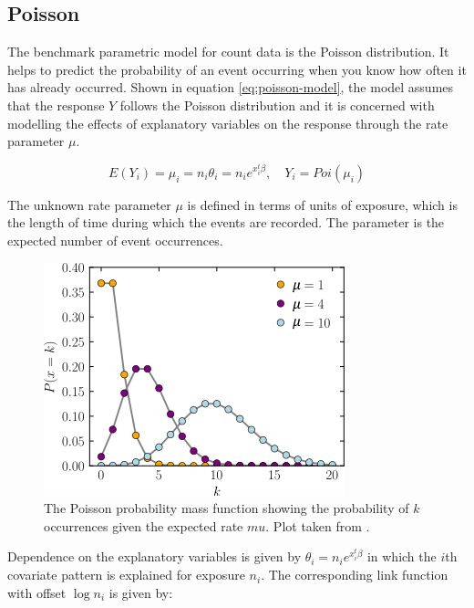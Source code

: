 \documentclass{thesis}
\begin{document}
\subsection{Poisson}

The benchmark parametric model for count data is the Poisson distribution\cite{cameron_trivedi_2013}. It helps to predict the probability of an event occurring when you know how often it has already occurred. Shown in equation \ref{eq:poisson-model}, the model assumes that the response $Y$ follows the Poisson distribution and it is concerned with modelling the effects of explanatory variables on the response through the rate parameter $\mu$. 

\begin{equation}
    E(Y_i) = \mu_i = n_i\theta_i = n_ie^{x_i^t\beta},\hspace{1em}Y_i = Poi(\mu_i)
    \label{eq:poisson-model}
\end{equation}

The unknown rate parameter $\mu$ is defined in terms of units of exposure, which is the length of time during which the events are recorded\cite{cameron_trivedi_2013}. The parameter is the expected number of event occurrences.

\begin{figure}[h]
    \centering
    \includegraphics[scale=0.8]{images/poisson-pmf.png}
    \caption{The Poisson probability mass function showing the probability of $k$ occurrences given the expected rate $mu$. Plot taken from \cite{poisson-wikipedia}.}
    \label{fig:poisson-pmf}
\end{figure}

Dependence on the explanatory variables is given by $\theta_i = n_ie^{x_i^t\beta}$ in which the $i$th covariate pattern is explained for exposure $n_i$. The corresponding link function with offset $\log{n_i}$ is given by:
\end{document}
